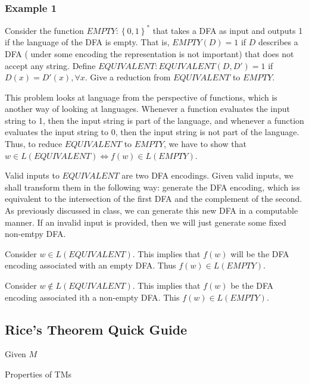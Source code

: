 \subsubsection{Example 1}
Consider the function $EMPTY : \left\{0, 1\right\}^\ast$ that takes a
DFA as input and outputs 1 if the language of the DFA is empty. That is,
$EMPTY(D) = 1$ if $D$ describes a DFA ( under some encoding the
representation is not important) that does not accept any string. Define
$EQUIVALENT: EQUIVALENT(D, D') = 1$ if $D(x) = D'(x), \forall x$. Give a
reduction from $EQUIVALENT$ to $EMPTY$.

This problem looks at language from the perspective of functions, which
is another way of looking at languages. Whenever a function evaluates
the input string to 1, then the input string is part of the language,
and whenever a function evaluates the input string to 0, then the input
string is not part of the language. Thus, to reduce $EQUIVALENT$ to
$EMPTY$, we have to show that $w \in L(EQUIVALENT) \iff f(w) \in
L(EMPTY)$.

Valid inputs to $EQUIVALENT$ are two DFA encodings. Given valid inputs,
we shall transform them in the following way: generate the DFA encoding,
which iss equivalent to the intersection of the first DFA and the
complement of the second. As previously discussed in class, we can
generate this new DFA in a computable manner. If an invalid input is
provided, then we will just generate some fixed non-emtpy DFA.

Consider $w \in L(EQUIVALENT)$. This implies that $f(w)$ will be the DFA
encoding associated with an empty DFA. Thus $f(w) \in L(EMPTY)$.

Consider $w\notin L(EQUIVALENT)$. This implies that $f(w)$ be the DFA
encoding associated ith a non-empty DFA. This $f(w) \in L(EMPTY)$.

\subsection{Rice's Theorem Quick Guide}
Given $M$
\begin{center}
\end{center}

Properties of TMs
\begin{center}
\end{center}